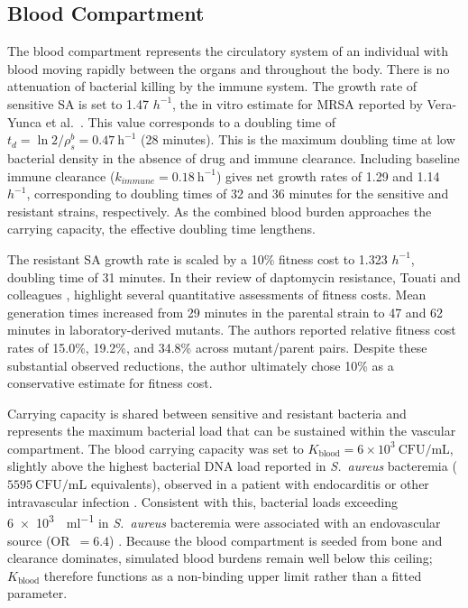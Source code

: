\documentclass[journal]{IEEEtran}
\begin{document}
\subsection{Blood Compartment}

The blood compartment represents the circulatory system of an individual with blood moving rapidly between the organs and throughout the body.  There is no attenuation of bacterial killing by the immune system. The growth rate of sensitive SA is set to 1.47 $h^{-1}$, the in vitro estimate for MRSA reported by Vera-Yunca et al.~\cite{VeraYunca2025}.  This value corresponds to a doubling time of $t_d = \ln 2 / \rho_s^{b} = 0.47~\mathrm{h}^{-1}$ (28 minutes). This is the maximum doubling time at low bacterial density in the absence of drug and immune clearance. Including baseline immune clearance ($k_{immune} = 0.18~\mathrm{h}^{-1}$) gives net growth rates of 1.29 and 1.14 ${h}^{-1}$, corresponding to doubling times of 32 and 36 minutes for the sensitive and resistant strains, respectively. As the combined blood burden approaches the carrying capacity, the effective doubling time lengthens.

The resistant SA growth rate is scaled by a 10\% fitness cost to 1.323 $h^{-1}$, doubling time of 31 minutes. In their review of daptomycin resistance, Touati and colleagues \cite{touati2021fitness}, highlight several quantitative assessments of fitness costs. Mean generation times increased from 29 minutes in the parental strain to 47 and 62 minutes in laboratory-derived mutants.  The authors reported relative fitness cost rates of 15.0\%, 19.2\%, and 34.8\% across mutant/parent pairs.  Despite these substantial observed reductions, the author ultimately chose 10\% as a conservative estimate for fitness cost.

Carrying capacity is shared between sensitive and resistant bacteria and represents the maximum bacterial load that can be sustained within the vascular compartment. The blood carrying capacity was set to $K_{\mathrm{blood}} = 6 \times 10^{3}~\mathrm{CFU/mL}$,
slightly above the highest bacterial DNA load reported in \textit{S.~aureus}
bacteremia ($5595~\mathrm{CFU/mL}$ equivalents), observed in a patient with endocarditis or
other intravascular infection \cite{nieman2022bacterial}. Consistent with this, bacterial
loads exceeding \SI{6e3}{\CFU\per\milli\litre} in \textit{S.~aureus} bacteremia were associated
with an endovascular source (OR~$=6.4$) \cite{Turkeltaub2024}. Because the blood
compartment is seeded from bone and clearance dominates, simulated blood burdens
remain well below this ceiling; $K_{\mathrm{blood}}$ therefore functions as a
non-binding upper limit rather than a fitted parameter.
\end{document}
